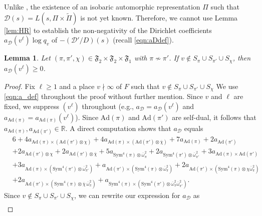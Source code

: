 \documentclass[11pt]{amsart}
\newtheorem{lemma}[theorem]{Lemma}
\theoremstyle{remark}
\numberwithin{equation}{section}
\begin{document}
Unlike \cite{Banks,HoffsteinLockhart,HoffsteinRamakrishnan,Luo,RamakrishnanWang}, the existence of an isobaric automorphic representation $\Pi$ such that $\mathcal{D}(s)=L(s,\Pi\times\widetilde{\Pi})$ is not yet known.  Therefore, we cannot use Lemma \ref{lem:HR} to establish the non-negativity of the Dirichlet coefficients $a_{\mathcal{D}}(v^{\ell})\log q_v$ of $-(\mathcal{D}'/D)(s)$ (recall \eqref{eqn:aDdef}).
\begin{lemma}
	\label{lem:coeff}
Let $(\pi,\pi',\chi)\in\mathfrak{F}_2\times\mathfrak{F}_2\times\mathfrak{F}_1$ with $\pi\not\sim\pi'$.  If $v\notin S_{\pi}\cup S_{\pi'}\cup S_{\chi}$, then $a_{\mathcal{D}}(v^{\ell})\geq 0$.
\end{lemma}
\begin{proof}
Fix $\ell\geq 1$ and a place $v\nmid\infty$ of $F$ such that $v\notin S_{\pi}\cup S_{\pi'}\cup S_{\chi}$ We use \eqref{eqn:a_def} throughout the proof without further mention.  Since $v$ and $\ell$ are fixed, we suppress $(v^{\ell})$ throughout (e.g., $a_{\mathcal{D}}=a_{\mathcal{D}}(v^{\ell})$ and $a_{\mathrm{Ad}(\pi)}=a_{\mathrm{Ad}(\pi)}(v^{\ell})$).  Since $\mathrm{Ad}(\pi)$ and $\mathrm{Ad}(\pi')$ are self-dual, it follows that $a_{\mathrm{Ad}(\pi)},a_{\mathrm{Ad}(\pi')}\in\mathbb{R}$.  A direct computation shows that $a_{\mathcal{D}}$ equals
\begin{align*}
&6+4a_{\mathrm{Ad}(\pi)\times(\mathrm{Ad}(\pi')\otimes\chi)}+4a_{\mathrm{Ad}(\pi)\times(\mathrm{Ad}(\pi')\otimes\overline{\chi})}+7a_{\mathrm{Ad}(\pi)}+2a_{\mathrm{Ad}(\pi')}\\
&+2a_{\mathrm{Ad}(\pi')\otimes\chi}+2a_{\mathrm{Ad}(\pi')\otimes\overline{\chi}}+5a_{\mathrm{Sym}^4(\pi)\otimes\overline{\omega}_{\pi}^{2}} + 2a_{\mathrm{Sym}^4(\pi')\otimes\overline{\omega}_{\pi'}^{2}} + 3a_{\mathrm{Ad}(\pi)\times\mathrm{Ad}(\pi')} \\
&+ 3a_{\mathrm{Ad}(\pi)\times(\mathrm{Sym}^4(\pi')\otimes\overline{\omega}_{\pi'}^{2})}+ a_{\mathrm{Ad}(\pi')\times(\mathrm{Sym}^4(\pi)\otimes\overline{\omega}_{\pi}^{2})}+ 2a_{\mathrm{Ad}(\pi')\times(\mathrm{Sym}^4(\pi)\otimes\chi \overline{\omega}_{\pi}^{2})}\\
&+2a_{\mathrm{Ad}(\pi')\times(\mathrm{Sym}^4(\pi)\otimes\overline{\chi}\,\overline{\omega}_{\pi}^{2})} + a_{\mathrm{Sym}^4(\pi)\times(\mathrm{Sym}^4(\pi')\otimes\overline{\omega}_{\pi}^{2} \overline{\omega}_{\pi'}^{2})}.
\end{align*}
Since $v\notin S_{\pi}\cup S_{\pi'}\cup S_{\chi}$, we can rewrite our expression for $a_{\mathcal{D}}$ as
\begin{align*}

\end{align*}
\end{proof}
\end{document}
